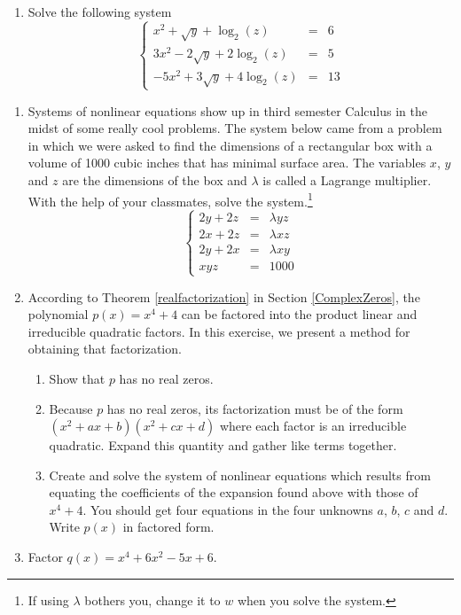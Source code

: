 \begin{enumerate}
\setcounter{enumi}{\value{HW}}

\item Solve the following system \[\left\{\begin{array}{rcr}  x^{2} + \sqrt{y} + \log_{2}(z) & = & 6 \\[3pt] 3x^{2} - 2\sqrt{y} + 2\log_{2}(z) & = & 5 \\[3pt] -5x^{2} + 3\sqrt{y} + 4\log_{2}(z) & = & 13 \end{array} \right.\]

\setcounter{HW}{\value{enumi}}
\end{enumerate}

\begin{enumerate}
\setcounter{enumi}{\value{HW}}


\item Systems of nonlinear equations show up in third semester Calculus in the midst of some really cool problems.  The system below came from a problem in which we were asked to find the dimensions of a rectangular box with a volume of 1000 cubic inches that has minimal surface area.  The variables $x$, $y$ and $z$ are the dimensions of the box and $\lambda$ is called a Lagrange multiplier.  With the help of your classmates, solve the system.\footnote{If using $\lambda$ bothers you, change it to $w$ when you solve the system.} \[\left\{\begin{array}{rcr}  2y + 2z & = & \lambda yz  \\ 2x + 2z & = & \lambda xz \\ 2y + 2x & = & \lambda xy \\ xyz & = & 1000 \end{array} \right.\]

\item According to Theorem \ref{realfactorization} in Section \ref{ComplexZeros}, the polynomial $p(x) = x^{4} + 4$ can be factored into the product linear and irreducible quadratic factors.  In this exercise, we present a method for obtaining that factorization.  
\label{factorpolywithnonlinear}

\begin{enumerate}

\item Show that $p$ has no real zeros.  

\item Because $p$ has no real zeros, its factorization must be of the form $(x^{2} + ax + b)(x^{2} + cx + d)$ where each factor is an irreducible quadratic.  Expand this quantity and gather like terms together.

\item Create and solve the system of nonlinear equations which results from equating the coefficients of the expansion found above with those of $x^{4} + 4$.  You should get four equations in the four unknowns $a$, $b$, $c$ and $d$.  Write $p(x)$ in factored form.

\end{enumerate}

\item Factor $q(x) = x^{4} + 6x^{2} - 5x + 6$.

\end{enumerate}

